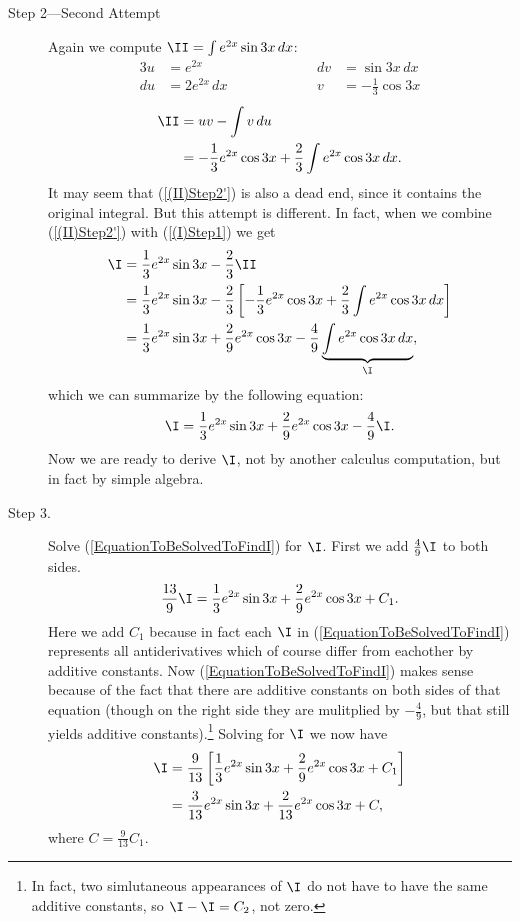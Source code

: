 \begin{description}
\item[Step 2---Second Attempt] Again we compute $\II=\int e^{2x}\sin3x\,dx$:
\begin{alignat*}{3}
u&=e^{2x}&&\qquad\qquad&dv&=\sin3x\,dx\\
du&=2e^{2x}\,dx&&&v&=-\frac13\cos3x\end{alignat*}
\begin{align}
\II&=uv-\int v\,du\notag\\
   &=-\frac13e^{2x}\cos3x+\frac23\int e^{2x}\cos3x\,dx.
   \label{(II)Step2'}\end{align}
It may seem that (\ref{(II)Step2'}) is also a dead end,
since it contains the original integral. But this
attempt is different. In fact,
when we combine (\ref{(II)Step2'}) with (\ref{(I)Step1}) we get
\begin{align*}
\I&=\frac13e^{2x}\sin3x-\frac23\II\\
  &=\frac13e^{2x}\sin3x-\frac23\left[-\frac13e^{2x}\cos3x
                                 +\frac23\int e^{2x}\cos3x\,dx\right]\\
  &=\frac13e^{2x}\sin3x+\frac29e^{2x}\cos3x-\frac49
\underbrace{\int e^{2x}\cos3x\,dx}_{\I},
\end{align*}
which we can summarize by the following equation:
\begin{equation}
\I=\frac13e^{2x}\sin3x+\frac29e^{2x}\cos3x-\frac49\I.
\label{EquationToBeSolvedToFindI}
\end{equation}
Now we are ready to derive $\I$, not by another calculus computation,
but in fact by simple algebra.
\item[Step 3.] Solve (\ref{EquationToBeSolvedToFindI}) for $\I$.
First we add $\frac49\I$ to both sides.
$$\frac{13}{9}\I=\frac13e^{2x}\sin3x+\frac29e^{2x}\cos3x+C_1.$$
Here we add $C_1$ because in fact each $\I$ in 
(\ref{EquationToBeSolvedToFindI}) represents
all antiderivatives which of course differ from eachother by
additive constants.  Now (\ref{EquationToBeSolvedToFindI})
makes sense because of the fact that there are additive constants on both
sides of that equation (though on the right side they are 
mulitplied by $-\frac49$, but that still yields additive constants).\footnote{%
In fact, two simlutaneous appearances of $\I$ do not have to have
the same additive constants, so $\I-\I=C_2$, not zero.%
}  
Solving for $\I$ we now have
\begin{align}
\I&=\frac9{13}\left[\frac13e^{2x}\sin3x+\frac29e^{2x}\cos3x+C_1\right]\notag\\
&=\frac3{13}e^{2x}\sin3x+\frac2{13}e^{2x}\cos3x+C,
\end{align}
where $C=\frac9{13}C_1$.
\end{description}
\label{ExampleIntEx(2x)Sin3x;SolveFor(I)}\eex


